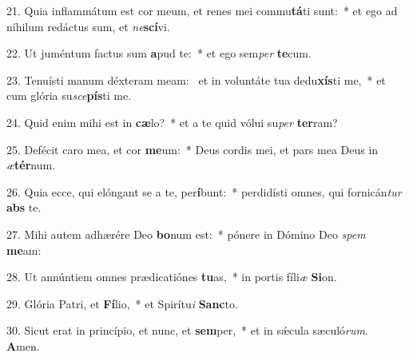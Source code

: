 21. Quia inflammátum est cor meum, et renes mei commu\textbf{tá}ti sunt:~*  et ego ad níhilum redáctus sum, et \textit{ne}\textbf{scí}vi.\

22. Ut juméntum factus sum \textbf{a}pud te:~*  et ego sem\textit{per} \textbf{te}cum.\

23. Tenuísti manum déxteram meam: \dag\  et in voluntáte tua dedu\textbf{xís}ti me,~*  et cum glória su\textit{sce}\textbf{pís}ti me.\

24. Quid enim mihi est in \textbf{cæ}lo?~*  et a te quid vólui su\textit{per} \textbf{ter}ram?\

25. Defécit caro mea, et cor \textbf{me}um:~*  Deus cordis mei, et pars mea Deus in \textit{æ}\textbf{tér}num.\

26. Quia ecce, qui elóngant se a te, per\textbf{í}bunt:~*  perdidísti omnes, qui fornicán\textit{tur} \textbf{abs} te.\

27. Mihi autem adhærére Deo \textbf{bo}num est:~*  pónere in Dómino Deo \textit{spem} \textbf{me}am:\

28. Ut annúntiem omnes prædicatiónes \textbf{tu}as,~*  in portis fíli\textit{æ} \textbf{Si}on.\

29. Glória Patri, et \textbf{Fí}lio,~*  et Spirítu\textit{i} \textbf{Sanc}to.\

30. Sicut erat in princípio, et nunc, et \textbf{sem}per,~*  et in sǽcula sæculó\textit{rum}. \textbf{A}men.\

